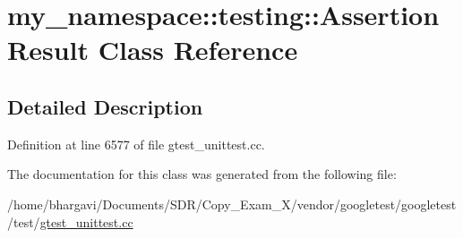 \hypertarget{classmy__namespace_1_1testing_1_1_assertion_result}{}\section{my\+\_\+namespace\+:\+:testing\+:\+:Assertion\+Result Class Reference}
\label{classmy__namespace_1_1testing_1_1_assertion_result}


\subsection{Detailed Description}


Definition at line 6577 of file gtest\+\_\+unittest.\+cc.



The documentation for this class was generated from the following file\+:\begin{DoxyCompactItemize}
\item 
/home/bhargavi/\+Documents/\+S\+D\+R/\+Copy\+\_\+\+Exam\+\_\+X/vendor/googletest/googletest/test/\hyperlink{gtest__unittest_8cc}{gtest\+\_\+unittest.\+cc}\end{DoxyCompactItemize}
